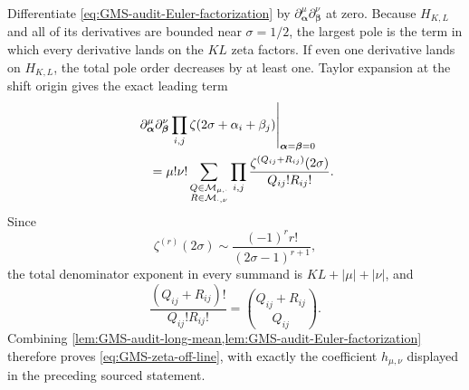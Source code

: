 Differentiate \eqref{eq:GMS-audit-Euler-factorization} by
$\partial_{\boldsymbol\alpha}^{\mu}\partial_{\boldsymbol\beta}^{\nu}$ at zero.  Because
$H_{K,L}$ and all of its derivatives are bounded near $\sigma=1/2$, the largest pole is the
term in which every derivative lands on the $KL$ zeta factors.  If even one derivative lands
on $H_{K,L}$, the total pole order decreases by at least one.  Taylor expansion at the shift
origin gives the exact leading term
\begin{align}
 &\left.
 \partial_{\boldsymbol\alpha}^{\mu}
 \partial_{\boldsymbol\beta}^{\nu}
 \prod_{i,j}\zeta(2\sigma+\alpha_i+\beta_j)
 \right|_{\boldsymbol\alpha=\boldsymbol\beta=0}\notag\\
 &\quad=\mu!\nu!
 \sum_{\substack{Q\in\mathcal M_{\mu,\cdot}\\
                   R\in\mathcal M_{\cdot,\nu}}}
 \prod_{i,j}
 \frac{\zeta^{(Q_{ij}+R_{ij})}(2\sigma)}{Q_{ij}!R_{ij}!}.
 \label{eq:GMS-audit-zeta-contingency}
\end{align}
Since
\begin{equation}
 \zeta^{(r)}(2\sigma)
 \sim\frac{(-1)^rr!}{(2\sigma-1)^{r+1}},
 \label{eq:GMS-audit-zeta-pole-derivative}
\end{equation}
the total denominator exponent in every summand is
$KL+|\mu|+|\nu|$, and
\begin{equation}
 \frac{(Q_{ij}+R_{ij})!}{Q_{ij}!R_{ij}!}
 =\binom{Q_{ij}+R_{ij}}{Q_{ij}}.
\end{equation}
Combining \cref{lem:GMS-audit-long-mean,lem:GMS-audit-Euler-factorization} therefore proves
\eqref{eq:GMS-zeta-off-line}, with exactly the coefficient $h_{\mu,\nu}$ displayed in the
preceding sourced statement.

